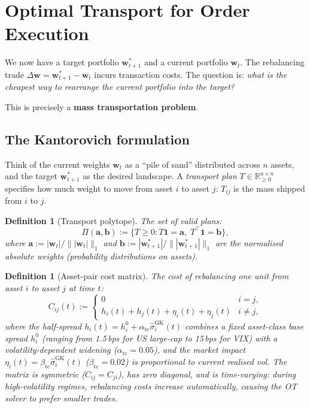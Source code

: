 \documentclass[11pt]{article}
\newtheorem{definition}[theorem]{Definition}
\newcommand{\R}{\mathbb{R}}
\newcommand{\bw}{\bm{w}}
\begin{document}
\section{Optimal Transport for Order Execution}\label{sec:ot}

We now have a target portfolio $\bw_{t+1}^*$ and a current portfolio $\bw_t$.
The rebalancing trade $\Delta\bw=\bw_{t+1}^*-\bw_t$ incurs transaction costs.
The question is: \emph{what is the cheapest way to rearrange the current portfolio
into the target?}

This is precisely a \textbf{mass transportation problem}.

\subsection{The Kantorovich formulation}

Think of the current weights $\bw_t$ as a ``pile of sand'' distributed
across $n$ assets, and the target $\bw_{t+1}^*$ as the desired landscape.
A \emph{transport plan} $T\in\R^{n\times n}_{\ge 0}$ specifies how much
weight to move from asset $i$ to asset $j$: $T_{ij}$ is the mass
shipped from $i$ to $j$.

\begin{definition}[Transport polytope]
The set of valid plans:
\begin{equation}
\Pi(\bm{a},\bm{b}) := \{T\ge 0 : T\bm{1}=\bm{a},\;T^\top\bm{1}=\bm{b}\},
\end{equation}
where $\bm{a}:=|\bw_t|/\||\bw_t|\|_1$ and $\bm{b}:=|\bw_{t+1}^*|/\||\bw_{t+1}^*|\|_1$
are the normalised absolute weights (probability distributions on assets).
\end{definition}

\begin{definition}[Asset-pair cost matrix]
The cost of rebalancing one unit from asset $i$ to asset $j$ at time $t$:
\begin{equation}\label{eq:cost}
C_{ij}(t) := \begin{cases}0 & i=j,\\
  h_i(t) + h_j(t) + \eta_i(t) + \eta_j(t) & i\neq j,\end{cases}
\end{equation}
where the half-spread $h_i(t) = h_i^0 + \alpha_{\mathrm{tc}}\hat\sigma_i^{\mathrm{GK}}(t)$
combines a fixed asset-class base spread $h_i^0$ (ranging from 1.5\,bps for
US large-cap to 15\,bps for VIX) with a volatility-dependent widening
($\alpha_{\mathrm{tc}}=0.05$), and the market impact
$\eta_i(t) = \beta_{\mathrm{tc}}\hat\sigma_i^{\mathrm{GK}}(t)$
($\beta_{\mathrm{tc}}=0.02$) is proportional to current realised vol.
The matrix is symmetric ($C_{ij}=C_{ji}$), has zero diagonal, and is
\emph{time-varying}: during high-volatility regimes, rebalancing costs
increase automatically, causing the OT solver to prefer smaller trades.
\end{definition}
\end{document}

